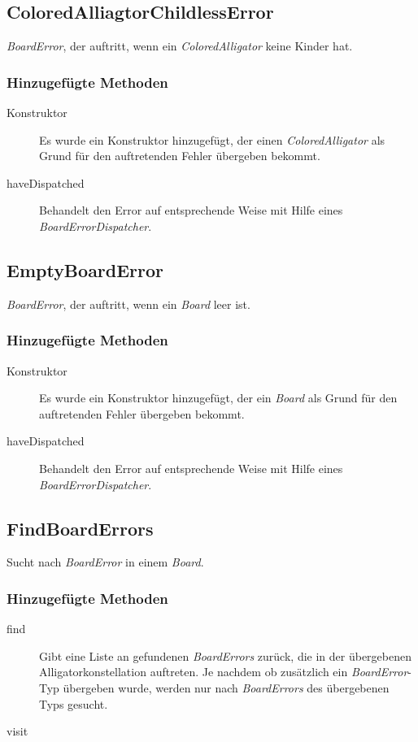 \subsection{ColoredAlliagtorChildlessError}
	\emph{BoardError}, der auftritt, wenn ein \emph{ColoredAlligator} keine Kinder hat.
	\subsubsection{Hinzugefügte Methoden}
	\begin{description}
		\item[Konstruktor] Es wurde ein Konstruktor hinzugefügt, der einen \emph{ColoredAlligator} als Grund für den 
			auftretenden Fehler übergeben bekommt.
		\item[haveDispatched]
			Behandelt den Error auf entsprechende Weise mit Hilfe eines \emph{BoardErrorDispatcher}.
	\end{description}

\subsection{EmptyBoardError}
	\emph{BoardError}, der auftritt, wenn ein \emph{Board} leer ist.
	\subsubsection{Hinzugefügte Methoden}
	\begin{description}
		\item[Konstruktor] Es wurde ein Konstruktor hinzugefügt, der ein \emph{Board} als Grund für den auftretenden 
			Fehler übergeben bekommt.
		\item[haveDispatched]
			Behandelt den Error auf entsprechende Weise mit Hilfe eines \emph{BoardErrorDispatcher}.
	\end{description}

\subsection{FindBoardErrors}
	Sucht nach \emph{BoardError} in einem \emph{Board}.
	\subsubsection{Hinzugefügte Methoden}
	\begin{description}
		\item[find]
			Gibt eine Liste an gefundenen \emph{BoardErrors} zurück, die in der übergebenen Alligatorkonstellation auftreten. 
			Je nachdem ob zusätzlich ein \emph{BoardError}-Typ übergeben wurde, werden nur nach \emph{BoardErrors} des 
			übergebenen Typs gesucht.
		\item[visit] 
	\end{description}


